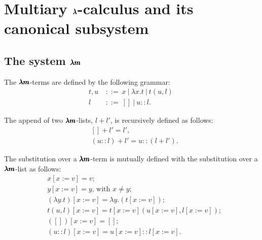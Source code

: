 \chapter{Multiary $\pmb{\lambda}$-calculus and its canonical subsystem}
\label{c:multiary}

\section{The system $\pmb{\lambda m}$}

\begin{definition}
  The $\pmb{\lambda m}$-terms are defined by the following grammar:  
  \begin{align*} 
    t, u \ &::= \ x \ | \ \lambda x . t \ | \ t(u, l) \ \\
    l      &::= \ []\  | \ u :: l.
  \end{align*}
\end{definition}

\begin{definition}[Append]
  The append of two $\pmb{\lambda m}$-lists, $l + l'$, is recursively defined as follows:
  \begin{align*}
  & [] + l' = l', \\
  & (u::l) + l' = u::(l + l').
  \end{align*}
\end{definition}

\begin{definition}
  The substitution over a $\pmb{\lambda m}$-term is mutually defined with the substitution over a $\pmb{\lambda m}$-list as follows:  
  \begin{align*}
  & x[x := v] = v ; \\
  & y[x := v] = y \text{, with } x \neq y ; \\
  & (\lambda y . t)[x := v] = \lambda y . (t[x := v]) ; \\
  & t(u, l)[x := v] = t[x := v](u[x := v], l[x := v]) ; \\    
  & ([])[x := v] = [] ; \\ 
  & (u::l)[x := v] = u[x := v] :: l[x := v] .
  \end{align*}
\end{definition}

